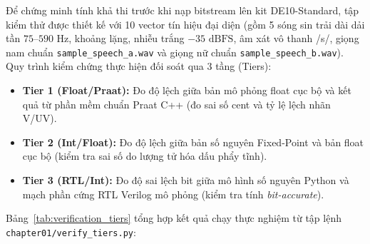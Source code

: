 \documentclass[11pt,a4paper]{article}
\begin{document}
Để chứng minh tính khả thi trước khi nạp bitstream lên kit DE10-Standard, tập kiểm thử được thiết kế với 10 vector tín hiệu đại diện (gồm 5 sóng sin trải dài dải tần $75\text{--}590\text{ Hz}$, khoảng lặng, nhiễu trắng $-35\text{ dBFS}$, âm xát vô thanh /s/, giọng nam chuẩn \texttt{sample\_speech\_a.wav} và giọng nữ chuẩn \texttt{sample\_speech\_b.wav}). Quy trình kiểm chứng thực hiện đối soát qua 3 tầng (Tiers):
\begin{itemize}
    \setlength{\itemsep}{0.5pt}
    \item \textbf{Tier 1 (Float/Praat):} Đo độ lệch giữa bản mô phỏng float cục bộ và kết quả từ phần mềm chuẩn Praat C++ (đo sai số cent và tỷ lệ lệch nhãn V/UV).
    \item \textbf{Tier 2 (Int/Float):} Đo độ lệch giữa bản số nguyên Fixed-Point và bản float cục bộ (kiểm tra sai số do lượng tử hóa dấu phẩy tĩnh).
    \item \textbf{Tier 3 (RTL/Int):} Đo độ sai lệch bit giữa mô hình số nguyên Python và mạch phần cứng RTL Verilog mô phỏng (kiểm tra tính \emph{bit-accurate}).
\end{itemize}

Bảng~\ref{tab:verification_tiers} tổng hợp kết quả chạy thực nghiệm từ tập lệnh \texttt{chapter01/verify\_tiers.py}:
\end{document}
